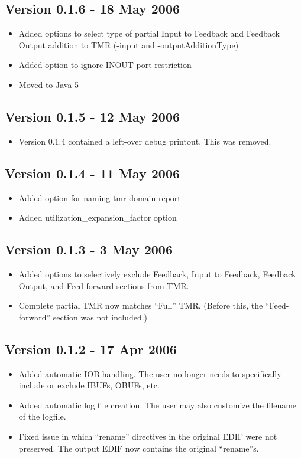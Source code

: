 \documentclass[english]{article}
\begin{document}
\subsection*{Version 0.1.6 - 18 May 2006}
\begin{itemize}
\item Added options to select type of partial Input to Feedback and Feedback 
Output addition to TMR (-input and -outputAdditionType)
\item Added option to ignore INOUT port restriction
\item Moved to Java 5
\end{itemize}

\subsection*{Version 0.1.5 - 12 May 2006}
\begin{itemize}
\item Version 0.1.4 contained a left-over debug printout. This was removed.
\end{itemize}

\subsection*{Version 0.1.4 - 11 May 2006}
\begin{itemize}
\item Added option for naming tmr domain report
\item Added utilization\_expansion\_factor option
\end{itemize}

\subsection*{Version 0.1.3 - 3 May 2006}
\begin{itemize}
\item Added options to selectively exclude Feedback, Input to Feedback, 
Feedback Output, and Feed-forward sections from TMR.
\item Complete partial TMR now matches ``Full'' TMR\@. (Before this, the 
``Feed-forward'' section was not included.)
\end{itemize}

\subsection*{Version 0.1.2 - 17 Apr 2006}
\begin{itemize}
\item Added automatic IOB handling. The user no longer needs to specifically 
include or exclude IBUFs, OBUFs, etc.
\item Added automatic log file creation. The user may also customize the 
filename of the logfile.
\item Fixed issue in which ``rename'' directives in the original EDIF were not 
preserved. The output EDIF now contains the original ``rename''s.
\end{itemize}
\end{document}
